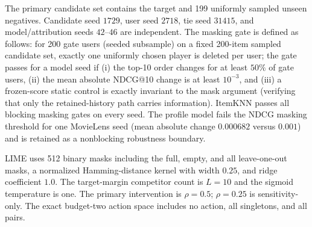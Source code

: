 \documentclass[manuscript,screen,review,anonymous]{acmart}
\begin{document}
The primary candidate set contains the target and 199 uniformly sampled unseen negatives. Candidate seed $1729$, user seed $2718$, tie seed $31415$, and model/attribution seeds $42$--$46$ are independent. The masking gate is defined as follows: for 200 gate users (seeded subsample) on a fixed 200-item sampled candidate set, exactly one uniformly chosen player is deleted per user; the gate passes for a model seed if (i) the top-10 order changes for at least $50\%$ of gate users, (ii) the mean absolute NDCG@10 change is at least $10^{-3}$, and (iii) a frozen-score static control is exactly invariant to the mask argument (verifying that only the retained-history path carries information). ItemKNN passes all blocking masking gates on every seed. The profile model fails the NDCG masking threshold for one MovieLens seed (mean absolute change $0.000682$ versus $0.001$) and is retained as a nonblocking robustness boundary.

LIME uses 512 binary masks including the full, empty, and all leave-one-out masks, a normalized Hamming-distance kernel with width $0.25$, and ridge coefficient $1.0$. The target-margin competitor count is $L=10$ and the sigmoid temperature is one. The primary intervention is $\rho=0.5$; $\rho=0.25$ is sensitivity-only. The exact budget-two action space includes no action, all singletons, and all pairs.
\end{document}
